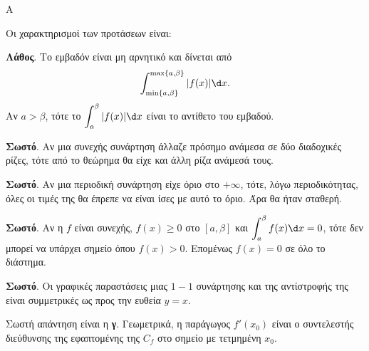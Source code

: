 \begin{thema}{Α}
\begin{erwthma}
\item {}

\item {}

\item {}

\item Οι χαρακτηρισμοί των προτάσεων είναι:
\begin{alist}
\item \textbf{Λάθος}. Το εμβαδόν είναι μη αρνητικό και δίνεται από
\[ \dint_{\min\{a,\beta\}}^{\max\{a,\beta\}} |f(x)|\d x. \]
Αν $a>\beta$, τότε το $\dint_a^\beta |f(x)|\d x$ είναι το αντίθετο του εμβαδού.
\item \textbf{Σωστό}. Αν μια συνεχής συνάρτηση άλλαζε πρόσημο ανάμεσα σε δύο διαδοχικές ρίζες, τότε από το θεώρημα  θα είχε και άλλη ρίζα ανάμεσά τους.
\item \textbf{Σωστό}. Αν μια περιοδική συνάρτηση είχε όριο στο $+\infty$, τότε, λόγω περιοδικότητας, όλες οι τιμές της θα έπρεπε να είναι ίσες με αυτό το όριο. Άρα θα ήταν σταθερή.
\item \textbf{Σωστό}. Αν η $f$ είναι συνεχής, $f(x)\ge0$ στο $[a,\beta]$ και $\dint_a^\beta f(x)\d x=0$, τότε δεν μπορεί να υπάρχει σημείο όπου $f(x)>0$. Επομένως $f(x)=0$ σε όλο το διάστημα.
\item \textbf{Σωστό}. Οι γραφικές παραστάσεις μιας $1-1$ συνάρτησης και της αντίστροφής της είναι συμμετρικές ως προς την ευθεία $y=x$.
\end{alist}

\item Σωστή απάντηση είναι η \textbf{γ}. Γεωμετρικά, η παράγωγος $f'(x_0)$ είναι ο συντελεστής διεύθυνσης της εφαπτομένης της $C_f$ στο σημείο με τετμημένη $x_0$.
\end{erwthma}
\end{thema}

